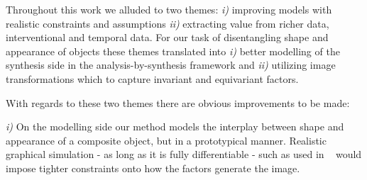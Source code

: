	Throughout this work we alluded to two themes: \emph{i)} improving models with realistic constraints and assumptions \emph{ii)} extracting value from richer data, \ie interventional and temporal data.
	For our task of disentangling shape and appearance of objects these themes translated into \emph{i)} better modelling of the synthesis side in the analysis-by-synthesis framework and \emph{ii)} utilizing image transformations \wrt which to capture invariant and equivariant factors.


	With regards to these two themes there are obvious improvements to be made:


	\emph{i)} On the modelling side our method models the interplay between shape and appearance of a composite object, but in a prototypical manner. Realistic graphical simulation - as long as it is fully differentiable - such as used in ~\cite{kulkarni15dcign, tieleman14thesis} would impose tighter constraints onto how the factors generate the image.

